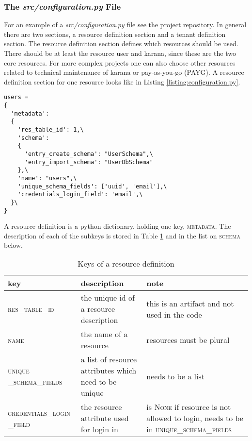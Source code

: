 \subsubsection{The \textit{src/configuration.py} File}\label{subsubsection:configuration.py}

For an example  of a \textit{src/configuration.py} file see the project repository. In general there are two sections, a resource definition section and a tenant definition section. The resource definition section defines which resources should be used. There should be at least the resource user and karana, since these are the two core resources. For more complex projects one can also choose other resources related to technical maintenance of karana or pay-as-you-go (PAYG). A resource definition section for one resource looks like in Listing \ref{listing:configuration.py}.
\lstset{language=Python}  
\begin{lstlisting}[caption={Example for a resource definiton in the \textit{src/configuration.py} file, here for the user resource},label={listing:configuration.py}]
users = 
{
  'metadata': 
  {
    'res_table_id': 1,\
    'schema': 
    {
      'entry_create_schema': "UserSchema",\
      'entry_import_schema': "UserDbSchema"
	},\
    'name': "users",\
    'unique_schema_fields': ['uuid', 'email'],\
    'credentials_login_field': 'email',\
  }\
}
\end{lstlisting}
A resource definition is a python dictionary, holding one key, \textsc{metadata}. The description of each of the subkeys is stored in Table \ref{table:configuration.py} and in the list on \textsc{schema} below.
\begin{table}
\begin{tabular}{ p{3cm}| p{4cm} | p{4cm} }
	key & description & note \\\hline
	 \textsc{res\_table\_id} & the unique id of a resource description & this is an artifact and not used in the code \\\hline
	\textsc{name} & the name of a resource  & resources must be plural \\	\hline
	\textsc{unique} \textsc{\_schema\_fields} & a list of resource attributes which need to be unique  & needs to be a list  \\\hline
	\textsc{credentials\_login} \textsc{\_field} & the  resource attribute  used for login in  & is \textsc{None} if resource is not allowed to login, needs to be in \textsc{unique\_schema\_fields}  \\\hline
\end{tabular}
\caption{Keys of a resource definition}\label{table:configuration.py}
\end{table}
